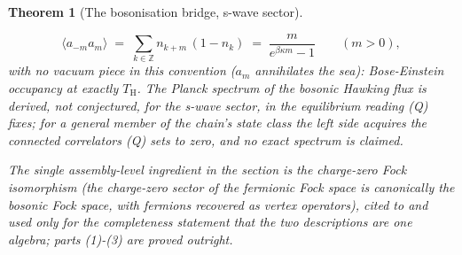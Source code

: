 \documentclass[11pt]{article}
\newtheorem{theorem}{Theorem}[section]
\theoremstyle{definition}
\theoremstyle{plain}
\providecommand{\TH}{}\renewcommand{\TH}{T_{\mathrm{H}}}
\begin{document}
\begin{theorem}[The bosonisation bridge, s-wave sector]
\begin{enumerate}
\[
\langle a_{-m} a_m \rangle \;=\; \sum_{k \in \mathbb{Z}} n_{k+m}\,(1 - n_k) \;=\; \frac{m}{e^{\beta\kappa m} - 1} \qquad (m > 0) ,
\]
with no vacuum piece in this convention ($a_m$ annihilates the sea): Bose-Einstein occupancy at exactly $\TH$. The Planck spectrum of the bosonic Hawking flux is derived, not conjectured, for the s-wave sector, in the equilibrium reading (Q) fixes; for a general member of the chain's state class the left side acquires the connected correlators (Q) sets to zero, and no exact spectrum is claimed.
\end{enumerate}
The single assembly-level ingredient in the section is the charge-zero Fock isomorphism (the charge-zero sector of the fermionic Fock space is canonically the bosonic Fock space, with fermions recovered as vertex operators), cited to \cite{PressleySegal1986} and used only for the completeness statement that the two descriptions are one algebra; parts (1)-(3) are proved outright.
\end{theorem}
\end{document}
